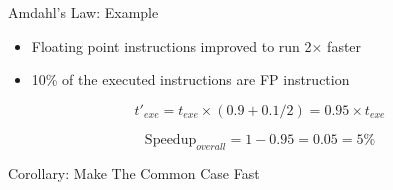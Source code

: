 \documentclass[aspectratio=169,12pt]{beamer}
\begin{document}
\begin{frame}{Amdahl's Law: Example}
\begin{itemize}
    \item Floating point instructions improved to run 2$\times$ faster
    \item 10\% of the executed instructions are FP instruction
\end{itemize}

\vspace{0.5cm}
$$t'_{exe} = t_{exe} \times (0.9 + 0.1 / 2) = 0.95 \times t_{exe}$$

$$\text{Speedup}_{overall} = 1 - 0.95 = 0.05 = 5\%$$

\vspace{1cm}
\begin{center}
\colorbox{gray!20}{
\Large Corollary: Make The Common Case Fast
}
\end{center}
\end{frame}
\end{document}
